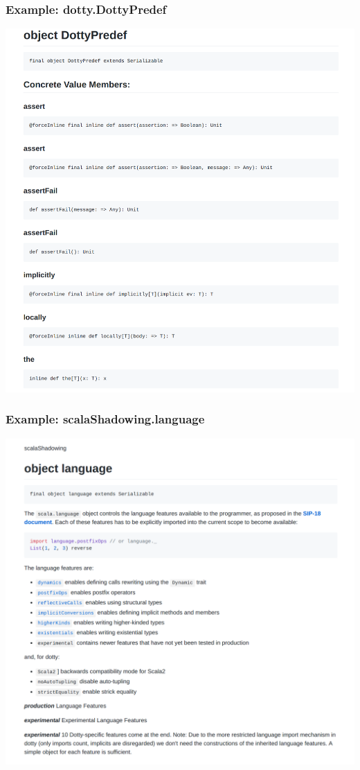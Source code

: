 \documentclass{beamer}
\begin{document}
\begin{frame}
  \frametitle{Example: dotty.DottyPredef}
  \begin{center}
    \includegraphics[width=\textwidth,height=0.9\textheight,keepaspectratio]{images/dottypredef.png}
  \end{center}
\end{frame}
\begin{frame}
  \frametitle{Example: scalaShadowing.language}
  \begin{center}
    \includegraphics[width=\textwidth,height=0.9\textheight,keepaspectratio]{images/language.png}
  \end{center}
\end{frame}
\end{document}
